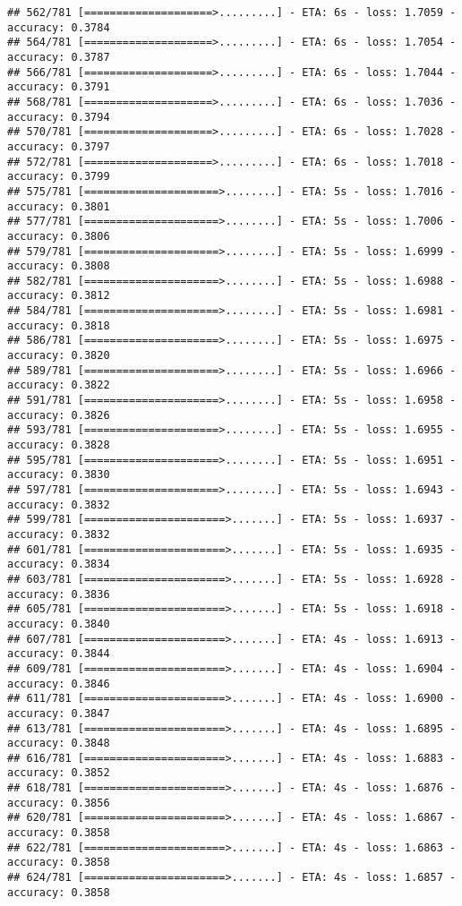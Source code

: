 \documentclass[
]{article}
\begin{document}
\begin{verbatim}
## 562/781 [====================>.........] - ETA: 6s - loss: 1.7059 - accuracy: 0.3784
## 564/781 [====================>.........] - ETA: 6s - loss: 1.7054 - accuracy: 0.3787
## 566/781 [====================>.........] - ETA: 6s - loss: 1.7044 - accuracy: 0.3791
## 568/781 [====================>.........] - ETA: 6s - loss: 1.7036 - accuracy: 0.3794
## 570/781 [====================>.........] - ETA: 6s - loss: 1.7028 - accuracy: 0.3797
## 572/781 [====================>.........] - ETA: 6s - loss: 1.7018 - accuracy: 0.3799
## 575/781 [=====================>........] - ETA: 5s - loss: 1.7016 - accuracy: 0.3801
## 577/781 [=====================>........] - ETA: 5s - loss: 1.7006 - accuracy: 0.3806
## 579/781 [=====================>........] - ETA: 5s - loss: 1.6999 - accuracy: 0.3808
## 582/781 [=====================>........] - ETA: 5s - loss: 1.6988 - accuracy: 0.3812
## 584/781 [=====================>........] - ETA: 5s - loss: 1.6981 - accuracy: 0.3818
## 586/781 [=====================>........] - ETA: 5s - loss: 1.6975 - accuracy: 0.3820
## 589/781 [=====================>........] - ETA: 5s - loss: 1.6966 - accuracy: 0.3822
## 591/781 [=====================>........] - ETA: 5s - loss: 1.6958 - accuracy: 0.3826
## 593/781 [=====================>........] - ETA: 5s - loss: 1.6955 - accuracy: 0.3828
## 595/781 [=====================>........] - ETA: 5s - loss: 1.6951 - accuracy: 0.3830
## 597/781 [=====================>........] - ETA: 5s - loss: 1.6943 - accuracy: 0.3832
## 599/781 [======================>.......] - ETA: 5s - loss: 1.6937 - accuracy: 0.3832
## 601/781 [======================>.......] - ETA: 5s - loss: 1.6935 - accuracy: 0.3834
## 603/781 [======================>.......] - ETA: 5s - loss: 1.6928 - accuracy: 0.3836
## 605/781 [======================>.......] - ETA: 5s - loss: 1.6918 - accuracy: 0.3840
## 607/781 [======================>.......] - ETA: 4s - loss: 1.6913 - accuracy: 0.3844
## 609/781 [======================>.......] - ETA: 4s - loss: 1.6904 - accuracy: 0.3846
## 611/781 [======================>.......] - ETA: 4s - loss: 1.6900 - accuracy: 0.3847
## 613/781 [======================>.......] - ETA: 4s - loss: 1.6895 - accuracy: 0.3848
## 616/781 [======================>.......] - ETA: 4s - loss: 1.6883 - accuracy: 0.3852
## 618/781 [======================>.......] - ETA: 4s - loss: 1.6876 - accuracy: 0.3856
## 620/781 [======================>.......] - ETA: 4s - loss: 1.6867 - accuracy: 0.3858
## 622/781 [======================>.......] - ETA: 4s - loss: 1.6863 - accuracy: 0.3858
## 624/781 [======================>.......] - ETA: 4s - loss: 1.6857 - accuracy: 0.3858

\end{verbatim}
\end{document}
